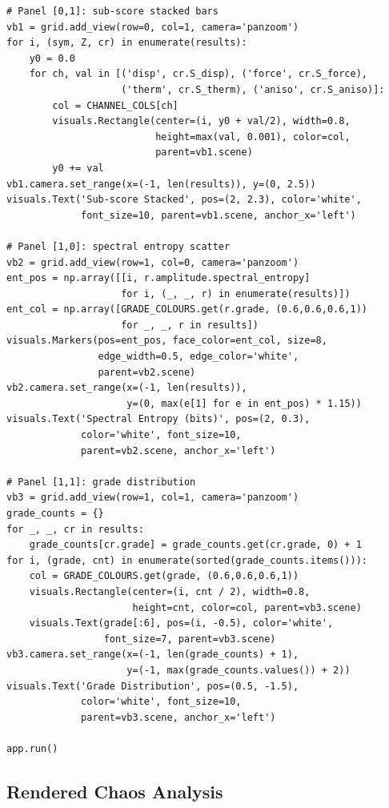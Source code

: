 \documentclass[11pt,a4paper]{article}
\begin{document}
\begin{lstlisting}[title={\textbf{Live VisPy four-panel chaos factor dashboard}}]
# Panel [0,1]: sub-score stacked bars
vb1 = grid.add_view(row=0, col=1, camera='panzoom')
for i, (sym, Z, cr) in enumerate(results):
    y0 = 0.0
    for ch, val in [('disp', cr.S_disp), ('force', cr.S_force),
                    ('therm', cr.S_therm), ('aniso', cr.S_aniso)]:
        col = CHANNEL_COLS[ch]
        visuals.Rectangle(center=(i, y0 + val/2), width=0.8,
                          height=max(val, 0.001), color=col,
                          parent=vb1.scene)
        y0 += val
vb1.camera.set_range(x=(-1, len(results)), y=(0, 2.5))
visuals.Text('Sub-score Stacked', pos=(2, 2.3), color='white',
             font_size=10, parent=vb1.scene, anchor_x='left')

# Panel [1,0]: spectral entropy scatter
vb2 = grid.add_view(row=1, col=0, camera='panzoom')
ent_pos = np.array([[i, r.amplitude.spectral_entropy]
                    for i, (_, _, r) in enumerate(results)])
ent_col = np.array([GRADE_COLOURS.get(r.grade, (0.6,0.6,0.6,1))
                    for _, _, r in results])
visuals.Markers(pos=ent_pos, face_color=ent_col, size=8,
                edge_width=0.5, edge_color='white',
                parent=vb2.scene)
vb2.camera.set_range(x=(-1, len(results)),
                     y=(0, max(e[1] for e in ent_pos) * 1.15))
visuals.Text('Spectral Entropy (bits)', pos=(2, 0.3),
             color='white', font_size=10,
             parent=vb2.scene, anchor_x='left')

# Panel [1,1]: grade distribution
vb3 = grid.add_view(row=1, col=1, camera='panzoom')
grade_counts = {}
for _, _, cr in results:
    grade_counts[cr.grade] = grade_counts.get(cr.grade, 0) + 1
for i, (grade, cnt) in enumerate(sorted(grade_counts.items())):
    col = GRADE_COLOURS.get(grade, (0.6,0.6,0.6,1))
    visuals.Rectangle(center=(i, cnt / 2), width=0.8,
                      height=cnt, color=col, parent=vb3.scene)
    visuals.Text(grade[:6], pos=(i, -0.5), color='white',
                 font_size=7, parent=vb3.scene)
vb3.camera.set_range(x=(-1, len(grade_counts) + 1),
                     y=(-1, max(grade_counts.values()) + 2))
visuals.Text('Grade Distribution', pos=(0.5, -1.5),
             color='white', font_size=10,
             parent=vb3.scene, anchor_x='left')

app.run()
\end{lstlisting}

\subsection{Rendered Chaos Analysis}
\end{document}
